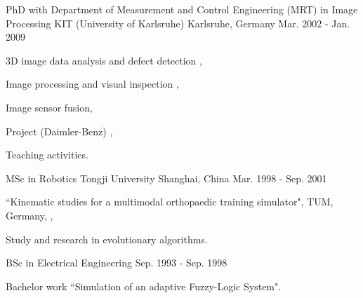 \documentclass[../resume.tex]{subfiles}
\begin{document}
\begin{cventries}
  \cventry
    {PhD with Department of Measurement and Control Engineering (MRT) in Image Processing} %
    {KIT (University of Karlsruhe)} %
    {Karlsruhe, Germany} %
    {Mar. 2002 - Jan. 2009} %
    {
      \begin{cvitems} %
        \item 3D image data analysis and defect detection \supercite{xin2008diss},
        \item Image processing and visual inspection \supercite{xin2009multiscale},
        \item Image sensor fusion,
        \item Project (Daimler-Benz) \supercite{Xin_Daimler_08},
        \item Teaching activities.
      \end{cvitems}
    }

  \cventry
    {MSc in Robotics} %
    {Tongji University} %
    {Shanghai, China} %
    {Mar. 1998 - Sep. 2001} %
    {
      \begin{cvitems} %
        \item ``Kinematic studies for a multimodal orthopaedic training simulator", TUM, Germany, \supercite{xin2002KneeSimulator},
        \item Study and research in evolutionary algorithms.
      \end{cvitems}
    }

  \cventry
    {BSc in Electrical Engineering} %
    {} %
    {} %
    {Sep. 1993 - Sep. 1998} %
    {
      \begin{cvitems} %
        \item Bachelor work ``Simulation of an adaptive Fuzzy-Logic System".
      \end{cvitems}
    }

\end{cventries}
\end{document}
